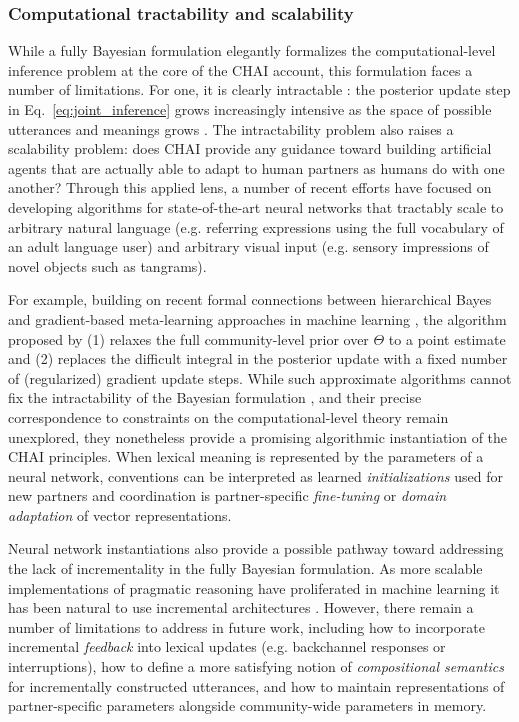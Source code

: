 \subsubsection{Computational tractability and scalability}

While a fully Bayesian formulation elegantly formalizes the computational-level inference problem at the core of the CHAI account, this formulation faces a number of limitations. 
For one, it is clearly intractable \cite{van2008tractable,van2019cognition}: the posterior update step in Eq.~\ref{eq:joint_inference} grows increasingly intensive as the space of possible utterances and meanings grows \cite{scalingupmodels}.
The intractability problem also raises a scalability problem: does CHAI provide any guidance toward building artificial agents that are actually able to adapt to human partners as humans do with one another?
Through this applied lens, a number of recent efforts have focused on developing algorithms for state-of-the-art neural networks that tractably scale to arbitrary natural language (e.g. referring expressions using the full vocabulary of an adult language user) and arbitrary visual input (e.g. sensory impressions of novel objects such as tangrams).

For example, building on recent formal connections between hierarchical Bayes and gradient-based meta-learning approaches in machine learning \cite{grant_recasting_2018}, the algorithm proposed by  (1) relaxes the full community-level prior over $\Theta$ to a point estimate and (2) replaces the difficult integral in the posterior update with a fixed number of (regularized) gradient update steps.
While such approximate algorithms cannot fix the intractability of the Bayesian formulation \cite{kwisthout2011bayesian}, and their precise correspondence to constraints on the computational-level theory remain unexplored, they nonetheless provide a promising algorithmic instantiation of the CHAI principles. 
When lexical meaning is represented by the parameters of a neural network, conventions can be interpreted as learned \emph{initializations} used for new partners and coordination is partner-specific \emph{fine-tuning} or \emph{domain adaptation} of vector representations. 

Neural network instantiations also provide a possible pathway toward addressing the lack of incrementality in the fully Bayesian formulation. 
As more scalable implementations of pragmatic reasoning have proliferated in machine learning \cite{vogel2013emergence,AndreasKlein16_Pragmatics,monroe_colors_2017,shen2019pragmatically,takmaz2020refer} it has been natural to use incremental architectures  \cite{augurzky2019gricean,cohn2018pragmatically,cohn2019incremental,waldon2021modeling}. 
However, there remain a number of limitations to address in future work, including how to incorporate incremental \emph{feedback} into lexical updates (e.g. backchannel responses or interruptions), how to define a more satisfying notion of \emph{compositional semantics} for incrementally constructed utterances, and how to maintain representations of partner-specific parameters alongside community-wide parameters in memory. 

